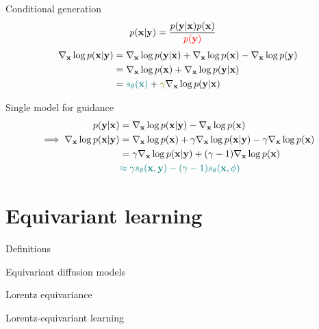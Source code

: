 \documentclass[aspectratio=169,xcolor=dvipsnames]{beamer}
\newcommand{\bx}{\mathbf{x}}
\newcommand{\by}{\mathbf{y}}
\newcommand{\nbx}{\nabla_{\bx}}
\begin{document}
\begin{frame}{Conditional generation}
  \begin{align*}
   p(\bx | \by) &= \frac{p(\by | \bx) p(\bx)}{\textcolor{red}{p(\by)}}
  \end{align*}
  \begin{align*}
    \nbx \log p(\bx | \by) &= \nbx \log p(\by | \bx) + \nbx \log p(\bx) - \nbx \log p(\by)\\
                           &= \nbx \log p(\bx) + \nbx \log p(\by | \bx) \\
                           &= \textcolor{teal}{s_\theta(\bx)} + \textcolor{olive}{\gamma} \nbx \log p(\by | \bx)
  \end{align*}
\end{frame}

\begin{frame}{Single model for guidance}
  \begin{align*}
    p(\by | \bx) &= \nbx \log p(\bx | \by) - \nbx \log p(\bx)\\
    \implies  \nbx \log p(\bx | \by) &= \nbx \log p(\bx) + \gamma \nbx \log p(\bx | \by) - \gamma \nbx \log p(\bx) \\
                                     &= \gamma \nbx \log p(\bx | \by) + (\gamma - 1)  \nbx \log p(\bx)\\
                                     &\textcolor{teal}{\approx \gamma s_\theta(\bx, \by) - (\gamma - 1) s_\theta(\bx, \phi)}
  \end{align*}
\end{frame}

\section{Equivariant learning}
\begin{frame}{Definitions}
  
\end{frame}

\begin{frame}{Equivariant diffusion models}
  
\end{frame}


\begin{frame}{Lorentz equivariance}
  
\end{frame}

\begin{frame}{Lorentz-equivariant learning}

\end{frame}
\end{document}
